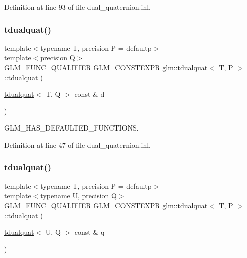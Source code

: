 Definition at line 93 of file dual\+\_\+quaternion.\+inl.

\mbox{\label{structglm_1_1tdualquat_a9cf5d2c303cd089e7a87d72172ea827e}} 
\subsubsection{\texorpdfstring{tdualquat()}{tdualquat()}\hspace{0.1cm}{\footnotesize\ttfamily [11/12]}}
{\footnotesize\ttfamily template$<$typename T, precision P = defaultp$>$ \\
template$<$precision Q$>$ \\
\mbox{\hyperlink{setup_8hpp_a33fdea6f91c5f834105f7415e2a64407}{G\+L\+M\+\_\+\+F\+U\+N\+C\+\_\+\+Q\+U\+A\+L\+I\+F\+I\+ER}} \mbox{\hyperlink{setup_8hpp_a08b807947b47031d3a511f03f89645ad}{G\+L\+M\+\_\+\+C\+O\+N\+S\+T\+E\+X\+PR}} \mbox{\hyperlink{structglm_1_1tdualquat}{glm\+::tdualquat}}$<$ T, P $>$\+::\mbox{\hyperlink{structglm_1_1tdualquat}{tdualquat}} (\begin{DoxyParamCaption}\item[{\mbox{\hyperlink{structglm_1_1tdualquat}{tdualquat}}$<$ T, Q $>$ const \&}]{d }\end{DoxyParamCaption})}



G\+L\+M\+\_\+\+H\+A\+S\+\_\+\+D\+E\+F\+A\+U\+L\+T\+E\+D\+\_\+\+F\+U\+N\+C\+T\+I\+O\+NS. 



Definition at line 47 of file dual\+\_\+quaternion.\+inl.

\mbox{\label{structglm_1_1tdualquat_a7a1546841d7a1b2bc12a5bfa65c625e8}} 
\subsubsection{\texorpdfstring{tdualquat()}{tdualquat()}\hspace{0.1cm}{\footnotesize\ttfamily [12/12]}}
{\footnotesize\ttfamily template$<$typename T, precision P = defaultp$>$ \\
template$<$typename U, precision Q$>$ \\
\mbox{\hyperlink{setup_8hpp_a33fdea6f91c5f834105f7415e2a64407}{G\+L\+M\+\_\+\+F\+U\+N\+C\+\_\+\+Q\+U\+A\+L\+I\+F\+I\+ER}} \mbox{\hyperlink{setup_8hpp_a08b807947b47031d3a511f03f89645ad}{G\+L\+M\+\_\+\+C\+O\+N\+S\+T\+E\+X\+PR}} \mbox{\hyperlink{structglm_1_1tdualquat}{glm\+::tdualquat}}$<$ T, P $>$\+::\mbox{\hyperlink{structglm_1_1tdualquat}{tdualquat}} (\begin{DoxyParamCaption}\item[{\mbox{\hyperlink{structglm_1_1tdualquat}{tdualquat}}$<$ U, Q $>$ const \&}]{q }\end{DoxyParamCaption})}



